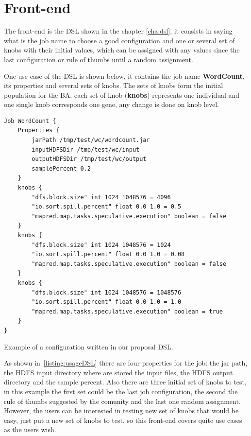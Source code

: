\section{Front-end}

The front-end is the DSL shown in the chapter \ref{cha:dsl}, it consists in
saying what is the job name to choose a good configuration and one or several set of
knobs with their initial values, which can be assigned with any values since the
last configuration or rule of thumbs until a random assignment.

One use case of the DSL is shown below, it contains the job name \textbf{WordCount},
its properties and several sets of knobs. The sets of knobs form the initial population
for the BA, each set of knob ({\bf knobs}) represents one individual
and one single knob corresponds one gene, any change is done on knob level.

\singlespacing
\begin{listing}[H]
\begin{verbatim}
Job WordCount {
    Properties {
        jarPath /tmp/test/wc/wordcount.jar
        inputHDFSDir /tmp/test/wc/input
        outputHDFSDir /tmp/test/wc/output
        samplePercent 0.2
    }
    knobs {
	    "dfs.block.size" int 1024 1048576 = 4096
	    "io.sort.spill.percent" float 0.0 1.0 = 0.5 
	    "mapred.map.tasks.speculative.execution" boolean = false
    }
    knobs {
	    "dfs.block.size" int 1024 1048576 = 1024
	    "io.sort.spill.percent" float 0.0 1.0 = 0.08
	    "mapred.map.tasks.speculative.execution" boolean = false
    }
    knobs {
	    "dfs.block.size" int 1024 1048576 = 1048576
	    "io.sort.spill.percent" float 0.0 1.0 = 1.0
	    "mapred.map.tasks.speculative.execution" boolean = true
    }
}
\end{verbatim}
\caption{Example of a configuration written in our proposal DSL.} 
\label{listing:usageDSL}
\end{listing}

As shown in~\ref{listing:usageDSL} there are four properties for the job: the jar path, the HDFS
input directory where are stored the input files, the HDFS output directory and the sample
percent. Also there are three initial set of knobs to test, in this example
the first set could be the last job configuration, the second the rule of thumbs
suggested by the comunity and the last one random assignment. However, the users
can be interested in testing new set of knobs that would be easy, just put a new
set of knobs to test, so this front-end covers quite use cases as the users wish.

